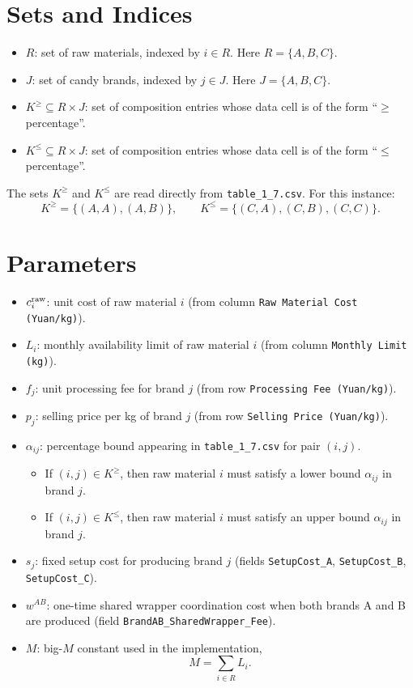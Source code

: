 \section*{Sets and Indices}

\begin{itemize}
    \item $R$: set of raw materials, indexed by $i \in R$. Here $R=\{A,B,C\}$.
    \item $J$: set of candy brands, indexed by $j \in J$. Here $J=\{A,B,C\}$.
    \item $K^{\ge} \subseteq R \times J$: set of composition entries whose data cell is of the form ``$\ge$ percentage''.
    \item $K^{\le} \subseteq R \times J$: set of composition entries whose data cell is of the form ``$\le$ percentage''.
\end{itemize}

The sets $K^{\ge}$ and $K^{\le}$ are read directly from \texttt{table\_1\_7.csv}. For this instance:
\[
K^{\ge}=\{(A,A),(A,B)\}, \qquad
K^{\le}=\{(C,A),(C,B),(C,C)\}.
\]

\section*{Parameters}

\begin{itemize}
    \item $c_i^{\rm raw}$: unit cost of raw material $i$ (from column \texttt{Raw Material Cost (Yuan/kg)}).
    \item $L_i$: monthly availability limit of raw material $i$ (from column \texttt{Monthly Limit (kg)}).
    \item $f_j$: unit processing fee for brand $j$ (from row \texttt{Processing Fee (Yuan/kg)}).
    \item $p_j$: selling price per kg of brand $j$ (from row \texttt{Selling Price (Yuan/kg)}).
    \item $\alpha_{ij}$: percentage bound appearing in \texttt{table\_1\_7.csv} for pair $(i,j)$.
    \begin{itemize}
        \item If $(i,j)\in K^{\ge}$, then raw material $i$ must satisfy a lower bound $\alpha_{ij}$ in brand $j$.
        \item If $(i,j)\in K^{\le}$, then raw material $i$ must satisfy an upper bound $\alpha_{ij}$ in brand $j$.
    \end{itemize}
    \item $s_j$: fixed setup cost for producing brand $j$ (fields \texttt{SetupCost\_A}, \texttt{SetupCost\_B}, \texttt{SetupCost\_C}).
    \item $w^{AB}$: one-time shared wrapper coordination cost when both brands A and B are produced (field \texttt{BrandAB\_SharedWrapper\_Fee}).
    \item $M$: big-$M$ constant used in the implementation,
    \[
    M=\sum_{i\in R} L_i.
    \]
\end{itemize}

